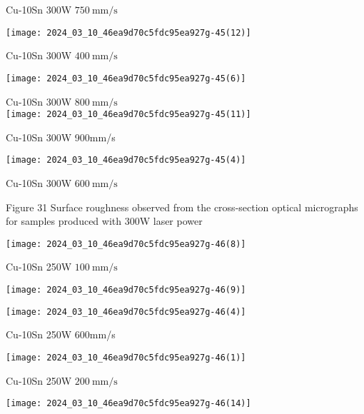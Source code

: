 \documentclass[10pt]{article}
\begin{document}
Cu-10Sn 300W $750 \mathrm{~mm} / \mathrm{s}$

\begin{center}
\texttt{[image: 2024\_03\_10\_46ea9d70c5fdc95ea927g-45(12)]}
\end{center}

Cu-10Sn 300W $400 \mathrm{~mm} / \mathrm{s}$

\begin{center}
\texttt{[image: 2024\_03\_10\_46ea9d70c5fdc95ea927g-45(6)]}
\end{center}

Cu-10Sn 300W $800 \mathrm{~mm} / \mathrm{s}$\\
\texttt{[image: 2024\_03\_10\_46ea9d70c5fdc95ea927g-45(11)]}

Cu-10Sn 300W 900mm/s

\begin{center}
\texttt{[image: 2024\_03\_10\_46ea9d70c5fdc95ea927g-45(4)]}
\end{center}

Cu-10Sn 300W $600 \mathrm{~mm} / \mathrm{s}$

Figure 31 Surface roughness observed from the cross-section optical micrographs for samples produced with 300W laser power

\begin{center}
\texttt{[image: 2024\_03\_10\_46ea9d70c5fdc95ea927g-46(8)]}
\end{center}

Cu-10Sn 250W $100 \mathrm{~mm} / \mathrm{s}$

\begin{center}
\texttt{[image: 2024\_03\_10\_46ea9d70c5fdc95ea927g-46(9)]}
\end{center}

\begin{center}
\texttt{[image: 2024\_03\_10\_46ea9d70c5fdc95ea927g-46(4)]}
\end{center}

Cu-10Sn 250W 600mm/s

\begin{center}
\texttt{[image: 2024\_03\_10\_46ea9d70c5fdc95ea927g-46(1)]}
\end{center}

Cu-10Sn 250W $200 \mathrm{~mm} / \mathrm{s}$

\begin{center}
\texttt{[image: 2024\_03\_10\_46ea9d70c5fdc95ea927g-46(14)]}
\end{center}
\end{document}
